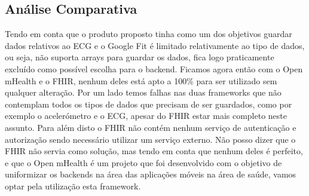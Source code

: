 \subsection{Análise Comparativa}
Tendo em conta que o produto proposto tinha como um dos objetivos guardar dados relativos ao \gls{ECG} e o Google Fit é limitado relativamente ao tipo de dados, ou seja, não suporta arrays para guardar os dados, fica logo praticamente excluído como possível escolha para o backend.
Ficamos agora então com o Open mHealth e o FHIR, nenhum deles está apto a 100\% para ser utilizado sem qualquer alteração. Por um lado temos falhas nas duas frameworks que não contemplam todos os tipos de dados que precisam de ser guardados, como por exemplo o acelerómetro e o \gls{ECG}, apesar do \gls{FHIR} estar mais completo neste assunto.
Para além disto o \gls{FHIR} não contém nenhum serviço de autenticação e autorização sendo necessário utilizar um serviço externo.
Não posso dizer que o \gls{FHIR} não servia como solução, mas tendo em conta que nenhum deles é perfeito, e que o Open mHealth é um projeto que foi desenvolvido com o objetivo de uniformizar os backends na área das aplicações móveis na área de saúde, vamos optar pela utilização esta framework.

\cleardoublepage